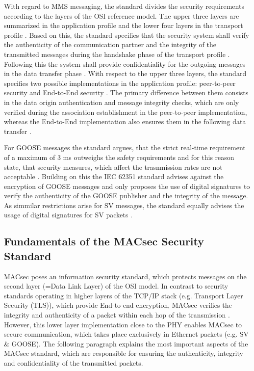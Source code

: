 \documentclass[conference]{IEEEtran}
\begin{document}
\smallskip
With regard to MMS messaging, the standard divides the security requirements according to the layers of the OSI reference model. The upper three layers 
are summarized in the application profile and the lower four layers in the transport profile \cite{SecureMMS:2020}. Based on this, the standard specifies 
that the security system shall verify the authenticity of the communication partner and the integrity of the transmitted messages during the handshake 
phase of the transport profile \cite{Review_IEC62351:2019}. Following this the system shall provide confidentiality for the outgoing messages in the data 
transfer phase \cite{SecureMMS:2020}. With respect to the upper three layers, the standard specifies two possible implementations in the application 
profile: peer-to-peer security and End-to-End security \cite{Review_IEC62351:2019}. The primary difference between them consists in the data origin 
authentication and message integrity checks, which are only verified during the association establishment in the peer-to-peer implementation, whereas 
the End-to-End implementation also ensures them in the following data transfer \cite{Review_IEC62351:2019}.

\smallskip
For GOOSE messages the standard argues, that the strict real-time requirement of a maximum of 3 ms \cite{GOOSE_confidentiality_integrity:2020} outweighs 
the safety requirements and for this reason state, that security measures, which affect the trasnmission rates are not acceptable \cite{PoisonedGOOSE:2014}. 
Building on this the IEC 62351 standard advises against the encryption of GOOSE messages and only proposes the use of digital signatures to verify the 
authenticity of the GOOSE publisher and the integrity of the message. As simmilar restrictions arise for SV messages, the standard equally advises the 
usage of digital signatures for SV packets \cite{Review_IEC62351:2019}. 

\subsection{Fundamentals of the MACsec Security Standard}
\noindent MACsec poses an information security standard, which protects messages on the second layer (=Data Link Layer) of the OSI model. In contrast 
to security standards operating in higher layers of the TCP/IP stack (e.g. Transport Layer Security (TLS)), which provide End-to-end encryption, MACsec 
verifies the integrity and authenticity of a packet within each hop of the transmission \cite{Cybersecurity_Substation:2016}. However, this lower layer 
implementation close to the PHY enables MACsec to secure communication, which takes place exclusively in Ethernet packets (e.g. SV \& GOOSE). The 
following paragraph explains the most important aspects of the MACsec standard, which are responsible for ensuring the authenticity, integrity and 
confidentiality of the transmitted packets.
\end{document}
